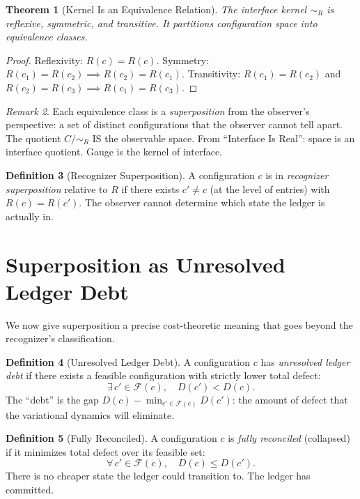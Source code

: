 \documentclass[11pt,a4paper]{article}
\theoremstyle{plain}
\newtheorem{theorem}{Theorem}[section]
\theoremstyle{definition}
\newtheorem{definition}[theorem]{Definition}
\theoremstyle{remark}
\newtheorem{remark}[theorem]{Remark}
\newcommand{\F}{\mathcal{F}}
\begin{document}
\begin{theorem}[Kernel Is an Equivalence Relation]\label{thm:kernel}
The interface kernel $\sim_R$ is reflexive, symmetric, and transitive.
It partitions configuration space into equivalence classes.
\end{theorem}

\begin{proof}
Reflexivity: $R(c) = R(c)$.
Symmetry: $R(c_1) = R(c_2) \implies R(c_2) = R(c_1)$.
Transitivity: $R(c_1) = R(c_2)$ and $R(c_2) = R(c_3) \implies R(c_1) = R(c_3)$.
\end{proof}

\begin{remark}
Each equivalence class is a \emph{superposition} from the observer's perspective: a set of distinct configurations that the observer cannot tell apart.
The quotient $C/{\sim_R}$ IS the observable space.
From ``Interface Is Real'': space is an interface quotient.
Gauge is the kernel of interface.
\end{remark}

\begin{definition}[Recognizer Superposition]\label{def:recsup}
A configuration $c$ is in \emph{recognizer superposition} relative to $R$ if there exists $c' \ne c$ (at the level of entries) with $R(c) = R(c')$.
The observer cannot determine which state the ledger is actually in.
\end{definition}

\section{Superposition as Unresolved Ledger Debt}\label{sec:superposition}

We now give superposition a precise cost-theoretic meaning that goes beyond the recognizer's classification.

\begin{definition}[Unresolved Ledger Debt]\label{def:debt}
A configuration $c$ has \emph{unresolved ledger debt} if there exists a feasible configuration with strictly lower total defect:
\[
\exists\, c' \in \F(c),\quad D(c') < D(c).
\]
The ``debt'' is the gap $D(c) - \min_{c' \in \F(c)} D(c')$: the amount of defect that the variational dynamics will eliminate.
\end{definition}

\begin{definition}[Fully Reconciled]\label{def:reconciled}
A configuration $c$ is \emph{fully reconciled} (collapsed) if it minimizes total defect over its feasible set:
\[
\forall\, c' \in \F(c),\quad D(c) \le D(c').
\]
There is no cheaper state the ledger could transition to.
The ledger has committed.
\end{definition}
\end{document}
